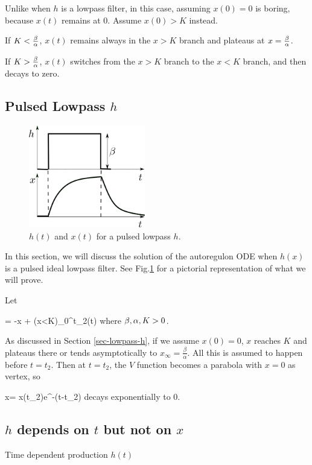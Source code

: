 Unlike when $h$ is a lowpass
filter, 
in this case,
assuming $x(0)=0$ is boring, because $x(t)$
remains at $0$. 
Assume
$x(0) >K$ instead. 

If $K<\frac{\beta}{\alpha}$,
$x(t)$ remains always in the $x>K$
branch and plateaus at $x=\frac{\beta}{\alpha}$.

If $K> \frac{\beta}{\alpha}$,
$x(t)$ switches from the $x>K$ branch to
the $x<K$ branch, and then decays to zero.






\subsection{Pulsed Lowpass $h$}

\begin{figure}[h!]
\centering
\includegraphics[width=2in]
{autoregulons/pulsed-lowpass.png}
\caption{$h(t)$ and
$x(t)$ for a pulsed lowpass $h$.
}
\label{fig-pulsed-lowpass}
\end{figure}

In this section, we will
discuss the solution of
the autoregulon ODE
when $h(x)$ is
a pulsed ideal lowpass filter.
See Fig.\ref{fig-pulsed-lowpass}
for a pictorial
representation of what we will prove.

Let 

\beq
{} = -\alp x + \beta\indi(x<K)\indi_{0}^{t_2}(t)
\eeq
where $\beta, \alpha, K>0$. 

As discussed in Section \ref{sec-lowpass-h},
if we assume $x(0)=0$,
$x$ reaches $K$ and plateaus there or tends asymptotically
to $x_\infty =\frac{\beta}{\alpha}$.
All this is assumed to happen before $t=t_2$.
Then at $t=t_2$,
the $V$ function becomes a
parabola with $x=0$
as vertex,
so 

\beq
x= x(t_2)e^{-\alp (t-t_2)}
\eeq
 decays exponentially to 0.
 
\subsection{$h$ depends on $t$ but not on $x$}
Time dependent production $h(t)$

